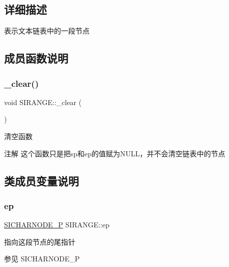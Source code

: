 \subsection{详细描述}
表示文本链表中的一段节点 

\subsection{成员函数说明}
\mbox{\label{struct_s_i_r_a_n_g_e_afa57adc9093ce9213bedf4bb4c74310a}} 
\subsubsection{\texorpdfstring{\+\_\+clear()}{\_clear()}}
{\footnotesize\ttfamily void S\+I\+R\+A\+N\+G\+E\+::\+\_\+clear (\begin{DoxyParamCaption}{ }\end{DoxyParamCaption})\hspace{0.3cm}{\ttfamily [inline]}}



清空函数~\newline


\begin{DoxyNote}{注解}
这个函数只是把sp和ep的值赋为\+N\+U\+L\+L，并不会清空链表中的节点 
\end{DoxyNote}


\subsection{类成员变量说明}
\mbox{\label{struct_s_i_r_a_n_g_e_aaa89b5ae16be7b890eba048bc212feec}} 
\subsubsection{\texorpdfstring{ep}{ep}}
{\footnotesize\ttfamily \hyperlink{class_s_i_c_h_a_r_n_o_d_e}{S\+I\+C\+H\+A\+R\+N\+O\+D\+E\+\_\+P} S\+I\+R\+A\+N\+G\+E\+::ep}



指向这段节点的尾指针 

\begin{DoxySeeAlso}{参见}
S\+I\+C\+H\+A\+R\+N\+O\+D\+E\+\_\+P 
\end{DoxySeeAlso}
\mbox{\label{struct_s_i_r_a_n_g_e_a7acdf296d873d6ed6fc203674109b715}} 
